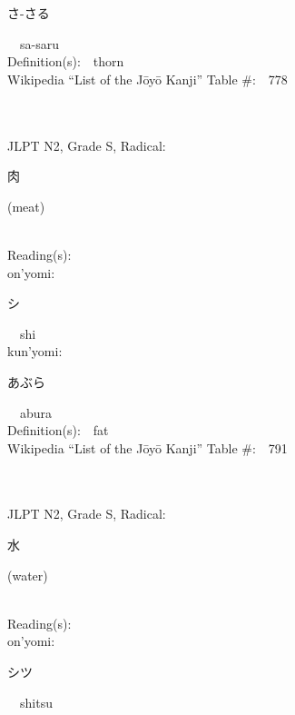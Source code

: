\begin{multicols}{2}
{\hspace*{2em}}{\begin{CJK}{UTF8}{min} さ-さる \end{CJK}}\ \ sa-saru\ \ \\
Definition(s):\ \ thorn \\
Wikipedia ``List of the J\=oy\=o Kanji'' Table \#:\ \ 778 \\
\ \ \\
{\fontsize{34pt}{40pt}  }\ \ \\  %
{JLPT N2, Grade S, Radical:\ \ {\begin{CJK}{UTF8}{min} 肉 \end{CJK}} (meat) } \\
Reading(s):\ \ \\
{\hspace*{1em}}on'yomi:\ \ \\
{\hspace*{2em}}{\begin{CJK}{UTF8}{min} シ \end{CJK}}\ \ shi\ \ \\
{\hspace*{1em}}kun'yomi:\ \ \\
{\hspace*{2em}}{\begin{CJK}{UTF8}{min} あぶら \end{CJK}}\ \ abura\ \ \\
Definition(s):\ \ fat \\
Wikipedia ``List of the J\=oy\=o Kanji'' Table \#:\ \ 791 \\
\ \ \\
{\fontsize{34pt}{40pt}  }\ \ \\  %
{JLPT N2, Grade S, Radical:\ \ {\begin{CJK}{UTF8}{min} 水 \end{CJK}} (water) } \\
Reading(s):\ \ \\
{\hspace*{1em}}on'yomi:\ \ \\
{\hspace*{2em}}{\begin{CJK}{UTF8}{min} シツ \end{CJK}}\ \ shitsu\ \ \\

\end{multicols}
